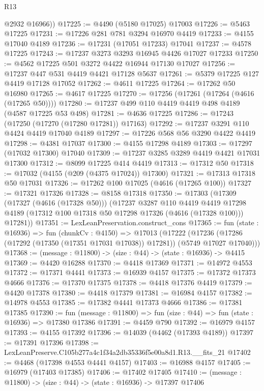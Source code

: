 \begin{lexlean}{R13}
\begin{coremodule}
        @2932
        @16966))
@17225 := @4490 (@5180 @17025) @17003
@17226 := @5463 @17225
@17231 := @17226 @281 @781 @3294 @16970 @4419
@17233 := @4155 @17040 @4189
@17236 := @17231 (@17051 @17233) @17041
@17237 := @4578 @17225
@17243 := @17237 @3273 @3293 @16945 @4426 @17027 @17233
@17250 := @4562 @17225 @501 @3272 @4422 @16944 @17130 @17027
@17256 := @17237 @447 @531 @4419 @4421 @17128 @5637
@17261 := @5379 @17225 @127 @4419 @17128 @17052
@17262 := @4611 @17225
@17264 := @17262 @50 @16980
@17265 := @4617 @17225
@17270 := @17256 (@17261 (@17264 (@4616 (@17265 @50))))
@17280 := @17237 @499 @110 @4419 @4419 @498 @4189 (@4587 @17225 @53 @498)
@17281 := @4636 @17225
@17286 := @17243 (@17250 (@17270 (@17280 @17281)) @17163)
@17292 := @17237 @3291 @110 @4424 @4419 @17040 @4189
@17297 := @17226 @568 @56 @3290 @4422 @4419
@17298 := @4381 @17037
@17300 := @4155 @17298 @4189
@17303 := @17297 (@17032 @17300) @17040
@17309 := @17237 @3285 @3289 @4419 @4421 @17031 @17300
@17312 := @8099 @17225 @414 @4419
@17313 := @17312 @50
@17318 := @17032 (@4155 (@209 (@4375 @17024)) @17300)
@17321 := @17313 @17318 @50 @17031
@17326 := @17262 @100 @17025 (@4616 (@17265 @100))
@17327 := @17321 @17326
@17328 := @8158 @17318
@17350 := @17303
    (@17309
      (@17327 (@4616 (@17328 @50)))
      (@17237
        @3287
        @110
        @4419
        @4419
        @17298
        @4189
        (@17312 @100 @17318 @50 @17298 @17326 (@4616 (@17328 @100)))
        @17281))
@17351 := LexLeanPreservation.construct_cons
@17365 := fun (state : @16936) =>
  fun (chunkCv : @4150) =>
  @17013
    (@17222 (@17236 (@17286 (@17292 (@17350 (@17351 @17031 @17038)) @17281)) (@5749 @17027 @17040)))
@17368 := (message : @11800) -> (size : @44) -> (state : @16936) -> @4415
@17369 := @4420 @16288
@17370 := @4418 @17369
@17371 := @14972 @4553
@17372 := @17371 @4441
@17373 := @16939 @4157
@17375 := @17372 @17373 @4666
@17376 := @17370 @17375
@17378 := @4418 @17376 @4419
@17379 := @4420 @17378
@17380 := @4418 @17379
@17381 := @16984 @4157
@17382 := @14978 @4553
@17385 := @17382 @4441 @17373 @4666
@17386 := @17381 @17385
@17390 := fun (message : @11800) => fun (size : @44) => fun (state : @16936) => @17380 @17386
@17391 := @4459 @790
@17392 := @16979 @4157
@17393 := @4155 @17392
@17396 := @14039 (@4462 (@17393 @4189))
@17397 := @17391 @17396
@17398 := LexLeanPreserve.C105b277a4c1f34a2db35336f5e00a8d1.R13.__fits_21
@17402 := @4468 (@17398 @4553 @4441 @4157)
@17403 := @16988 @4157
@17405 := @16979 (@17403 @17385)
@17406 := @17402 @17405
@17410 := (message : @11800) -> (size : @44) -> (state : @16936) -> @17397 @17406

\end{coremodule}
\end{lexlean}
